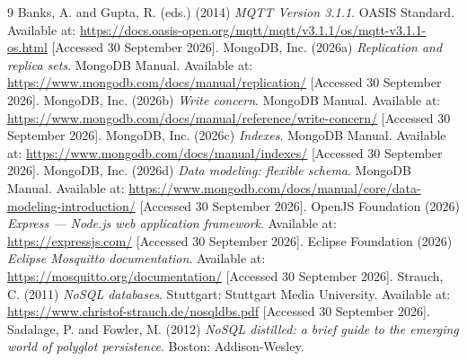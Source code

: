 \documentclass[11pt,a4paper]{article}
\begin{document}
\begin{thebibliography}{9}
 Banks, A. and Gupta, R. (eds.) (2014) \textit{MQTT Version 3.1.1}. OASIS Standard. Available at: \url{https://docs.oasis-open.org/mqtt/mqtt/v3.1.1/os/mqtt-v3.1.1-os.html} [Accessed 30 September 2026].
 MongoDB, Inc. (2026a) \textit{Replication and replica sets}. MongoDB Manual. Available at: \url{https://www.mongodb.com/docs/manual/replication/} [Accessed 30 September 2026].
 MongoDB, Inc. (2026b) \textit{Write concern}. MongoDB Manual. Available at: \url{https://www.mongodb.com/docs/manual/reference/write-concern/} [Accessed 30 September 2026].
 MongoDB, Inc. (2026c) \textit{Indexes}. MongoDB Manual. Available at: \url{https://www.mongodb.com/docs/manual/indexes/} [Accessed 30 September 2026].
 MongoDB, Inc. (2026d) \textit{Data modeling: flexible schema}. MongoDB Manual. Available at: \url{https://www.mongodb.com/docs/manual/core/data-modeling-introduction/} [Accessed 30 September 2026].
 OpenJS Foundation (2026) \textit{Express --- Node.js web application framework}. Available at: \url{https://expressjs.com/} [Accessed 30 September 2026].
 Eclipse Foundation (2026) \textit{Eclipse Mosquitto documentation}. Available at: \url{https://mosquitto.org/documentation/} [Accessed 30 September 2026].
 Strauch, C. (2011) \textit{NoSQL databases}. Stuttgart: Stuttgart Media University. Available at: \url{https://www.christof-strauch.de/nosqldbs.pdf} [Accessed 30 September 2026].
 Sadalage, P. and Fowler, M. (2012) \textit{NoSQL distilled: a brief guide to the emerging world of polyglot persistence}. Boston: Addison-Wesley.
\end{thebibliography}

\appendix
\end{document}
